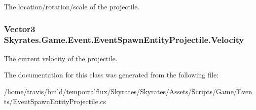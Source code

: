 The location/rotation/scale of the projectile. 

\hypertarget{class_skyrates_1_1_game_1_1_event_1_1_event_spawn_entity_projectile_a11c314dd0b38e9836c5f363b0e34c31f}{
\subsubsection[{Velocity}]{\setlength{\rightskip}{0pt plus 5cm}Vector3 Skyrates.\-Game.\-Event.\-Event\-Spawn\-Entity\-Projectile.\-Velocity}}\label{class_skyrates_1_1_game_1_1_event_1_1_event_spawn_entity_projectile_a11c314dd0b38e9836c5f363b0e34c31f}


The current velocity of the projectile. 



The documentation for this class was generated from the following file\-:\begin{DoxyCompactItemize}
\item 
/home/travis/build/temportalflux/\-Skyrates/\-Skyrates/\-Assets/\-Scripts/\-Game/\-Events/Event\-Spawn\-Entity\-Projectile.\-cs\end{DoxyCompactItemize}

